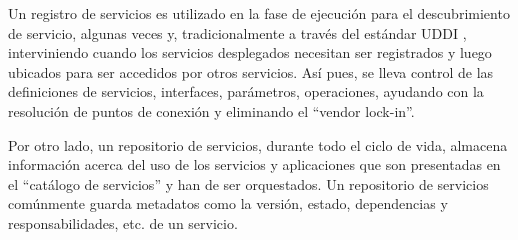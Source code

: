 Un registro de servicios es utilizado en la fase de ejecución para el descubrimiento de servicio, algunas veces y, tradicionalmente a través del estándar UDDI  \parencite{Oasis2016-dc}, interviniendo cuando los servicios desplegados necesitan ser registrados y luego ubicados para ser accedidos por otros servicios. Así pues, se lleva control de las definiciones de servicios, interfaces, parámetros, operaciones, ayudando con la resolución de puntos de conexión y eliminando el “vendor lock-in”.

Por otro lado, un repositorio de servicios, durante todo el ciclo de vida, almacena información acerca del uso de los servicios y aplicaciones que son presentadas en el “catálogo de servicios” y han de ser orquestados. Un repositorio de servicios comúnmente guarda metadatos como la versión, estado, dependencias y responsabilidades, etc. de un servicio.
